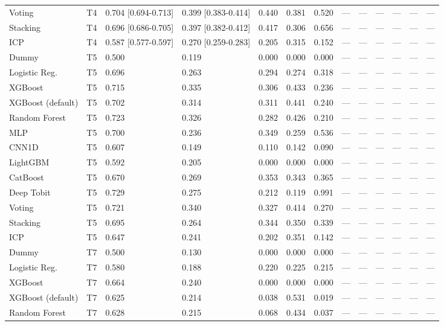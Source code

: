 \begin{table}
\begin{tabular}{lllllllllllll}
Voting & T4 & 0.704 [0.694-0.713] & 0.399 [0.383-0.414] & 0.440 & 0.381 & 0.520 & — & — & — & — & — & — \\
Stacking & T4 & 0.696 [0.686-0.705] & 0.397 [0.382-0.412] & 0.417 & 0.306 & 0.656 & — & — & — & — & — & — \\
ICP & T4 & 0.587 [0.577-0.597] & 0.270 [0.259-0.283] & 0.205 & 0.315 & 0.152 & — & — & — & — & — & — \\
Dummy & T5 & 0.500 & 0.119 & 0.000 & 0.000 & 0.000 & — & — & — & — & — & — \\
Logistic Reg. & T5 & 0.696 & 0.263 & 0.294 & 0.274 & 0.318 & — & — & — & — & — & — \\
XGBoost & T5 & 0.715 & 0.335 & 0.306 & 0.433 & 0.236 & — & — & — & — & — & — \\
XGBoost (default) & T5 & 0.702 & 0.314 & 0.311 & 0.441 & 0.240 & — & — & — & — & — & — \\
Random Forest & T5 & 0.723 & 0.326 & 0.282 & 0.426 & 0.210 & — & — & — & — & — & — \\
MLP & T5 & 0.700 & 0.236 & 0.349 & 0.259 & 0.536 & — & — & — & — & — & — \\
CNN1D & T5 & 0.607 & 0.149 & 0.110 & 0.142 & 0.090 & — & — & — & — & — & — \\
LightGBM & T5 & 0.592 & 0.205 & 0.000 & 0.000 & 0.000 & — & — & — & — & — & — \\
CatBoost & T5 & 0.670 & 0.269 & 0.353 & 0.343 & 0.365 & — & — & — & — & — & — \\
Deep Tobit & T5 & 0.729 & 0.275 & 0.212 & 0.119 & 0.991 & — & — & — & — & — & — \\
Voting & T5 & 0.721 & 0.340 & 0.327 & 0.414 & 0.270 & — & — & — & — & — & — \\
Stacking & T5 & 0.695 & 0.264 & 0.344 & 0.350 & 0.339 & — & — & — & — & — & — \\
ICP & T5 & 0.647 & 0.241 & 0.202 & 0.351 & 0.142 & — & — & — & — & — & — \\
Dummy & T7 & 0.500 & 0.130 & 0.000 & 0.000 & 0.000 & — & — & — & — & — & — \\
Logistic Reg. & T7 & 0.580 & 0.188 & 0.220 & 0.225 & 0.215 & — & — & — & — & — & — \\
XGBoost & T7 & 0.664 & 0.240 & 0.000 & 0.000 & 0.000 & — & — & — & — & — & — \\
XGBoost (default) & T7 & 0.625 & 0.214 & 0.038 & 0.531 & 0.019 & — & — & — & — & — & — \\
Random Forest & T7 & 0.628 & 0.215 & 0.068 & 0.434 & 0.037 & — & — & — & — & — & — \\

\end{tabular}
\end{table}
